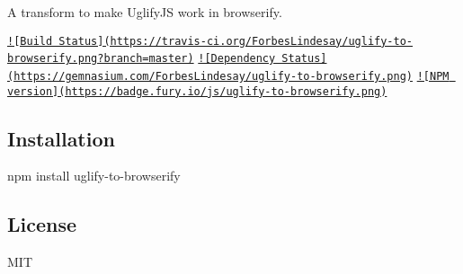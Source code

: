A transform to make Uglify\+J\+S work in browserify.

\href{https://travis-ci.org/ForbesLindesay/uglify-to-browserify}{\tt !\mbox{[}Build Status\mbox{]}(https\+://travis-\/ci.\+org/\+Forbes\+Lindesay/uglify-\/to-\/browserify.\+png?branch=master)} \href{https://gemnasium.com/ForbesLindesay/uglify-to-browserify}{\tt !\mbox{[}Dependency Status\mbox{]}(https\+://gemnasium.\+com/\+Forbes\+Lindesay/uglify-\/to-\/browserify.\+png)} \href{http://badge.fury.io/js/uglify-to-browserify}{\tt !\mbox{[}N\+P\+M version\mbox{]}(https\+://badge.\+fury.\+io/js/uglify-\/to-\/browserify.\+png)}

\subsection*{Installation}

\begin{DoxyVerb}npm install uglify-to-browserify
\end{DoxyVerb}


\subsection*{License}

M\+I\+T 